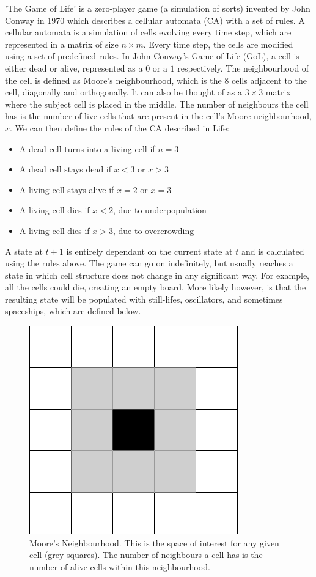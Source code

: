 \documentclass{l4proj}
\begin{document}
'The Game of Life' is a zero-player game (a simulation of sorts) invented by John Conway in 1970 which describes a cellular automata (CA) with a set of rules. A cellular automata is a simulation of cells evolving every time step, which are represented in a matrix of size $n\times m$. Every time step, the cells are modified using a set of predefined rules. In John Conway's Game of Life (GoL), a cell is either dead or alive, represented as a $0$ or a $1$ respectively. The neighbourhood of the cell is defined as Moore's neighbourhood, which is the 8 cells adjacent to the cell, diagonally and orthogonally. It can also be thought of as a $3\times 3$ matrix where the subject cell is placed in the middle. The number of neighbours the cell has is the number of live cells that are present in the cell's Moore neighbourhood, $x$. We can then define the rules of the CA described in Life:

\begin{itemize}
    \item A dead cell turns into a living cell if $n = 3$
    \item A dead cell stays dead if $x < 3$ or $x > 3$
    \item A living cell stays alive if $x = 2$ or $x = 3$
    \item A living cell dies if $x < 2$, due to underpopulation
    \item A living cell dies if $x > 3$, due to overcrowding
\end{itemize}

A state at $t+1$ is entirely dependant on the current state at $t$ and is calculated using the rules above. The game can go on indefinitely, but usually reaches a state in which cell structure does not change in any significant way. For example, all the cells could die, creating an empty board. More likely however, is that the resulting state will be populated with still-lifes, oscillators, and sometimes spaceships, which are defined below.

\begin{figure}[h]
\centering
\includegraphics[width=0.4\linewidth]{dissertation/images/diagrams/moores_neighbourhood.png}
\caption{Moore's Neighbourhood. This is the space of interest for any given cell (grey squares). The number of neighbours a cell has is the number of alive cells within this neighbourhood.}
\label{fig:subim1}

\end{figure}
\end{document}
